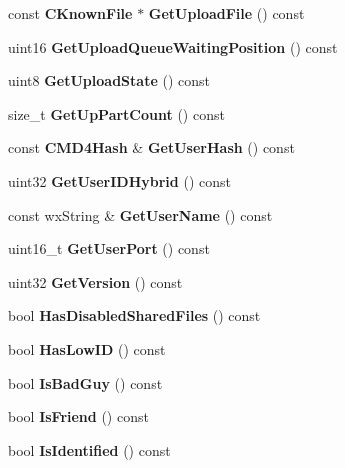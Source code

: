\begin{DoxyCompactItemize}
\item 
const {\bf CKnownFile} $\ast$ {\bfseries GetUploadFile} () const \label{classCClientRef_a4472c66c43710525bc99943a62a1bda8}

\item 
uint16 {\bfseries GetUploadQueueWaitingPosition} () const \label{classCClientRef_a79f72045e949f536a965a19c2f94ccbd}

\item 
uint8 {\bfseries GetUploadState} () const \label{classCClientRef_aae5c9acb7a967547fc387d40af8f4077}

\item 
size\_\-t {\bfseries GetUpPartCount} () const \label{classCClientRef_a1c8790448af40369fc25c236171c41e2}

\item 
const {\bf CMD4Hash} \& {\bfseries GetUserHash} () const \label{classCClientRef_ab13dd4095ad45c1344896906d66a0fbe}

\item 
uint32 {\bfseries GetUserIDHybrid} () const \label{classCClientRef_ab3df8bdf35c113f97cb380ba0eebd097}

\item 
const wxString \& {\bfseries GetUserName} () const \label{classCClientRef_af082069f7c1ea4fb5a6498139b46755f}

\item 
uint16\_\-t {\bfseries GetUserPort} () const \label{classCClientRef_af73d4386a5ed855cc0f81fc9dff6c2ea}

\item 
uint32 {\bfseries GetVersion} () const \label{classCClientRef_a5332c8f44c695a1c06b8bdf786e34402}

\item 
bool {\bfseries HasDisabledSharedFiles} () const \label{classCClientRef_a7095bf06f5f4e00be6ecfc8ad7ac3f64}

\item 
bool {\bfseries HasLowID} () const \label{classCClientRef_a7bdba5de2e9b5cdd77de82d9101859fa}

\item 
bool {\bfseries IsBadGuy} () const \label{classCClientRef_a5b8cdc5455063d956bab3879eb8484af}

\item 
bool {\bfseries IsFriend} () const \label{classCClientRef_a2d707e562472600a21f48be33535ffd6}

\item 
bool {\bfseries IsIdentified} () const \label{classCClientRef_a4b7e739afc92f8cc83a692e82f68a05d}


\end{DoxyCompactItemize}
